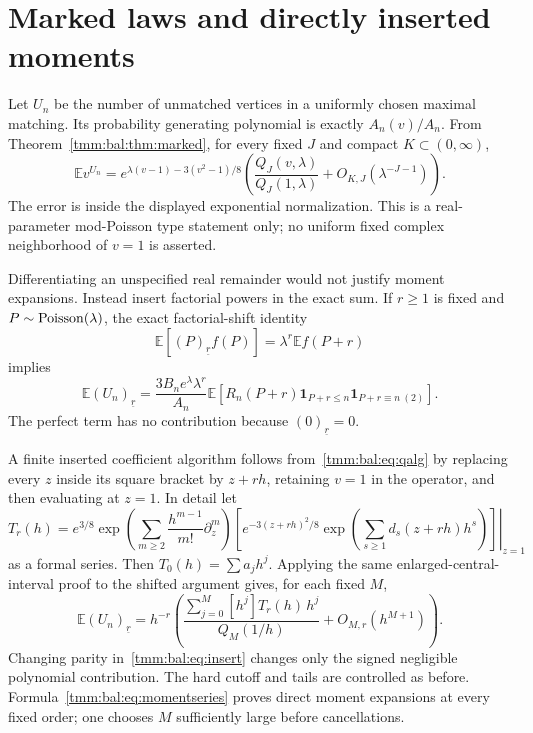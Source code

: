 \documentclass[11pt,letterpaper]{article}
\theoremstyle{remark}\newtheorem{remark}[theorem]{Remark}
\newcommand{\E}{\mathbb E}\newcommand{\Pp}{\mathbb P}
\newcommand{\one}{\mathbf 1}\newcommand{\TV}{d_{\mathrm{TV}}}
\newcommand{\fall}[2]{(#1)_{\underline{#2}}}
\begin{document}
\section{Marked laws and directly inserted moments}\label{tmm:bal:sec:moments}
Let $U_n$ be the number of unmatched vertices in a uniformly chosen maximal matching. Its probability generating polynomial is exactly $A_n(v)/A_n$. From Theorem~\ref{tmm:bal:thm:marked}, for every fixed $J$ and compact $K\subset(0,\infty)$,
\begin{equation}\label{tmm:bal:eq:mgf}
 \E v^{U_n}=e^{\lambda(v-1)-3(v^2-1)/8}
 \left(\frac{Q_J(v,\lambda)}{Q_J(1,\lambda)}
                 +O_{K,J}(\lambda^{-J-1})\right).
\end{equation}
The error is inside the displayed exponential normalization. This is a real-parameter mod-Poisson type statement only; no uniform fixed complex neighborhood of $v=1$ is asserted.

Differentiating an unspecified real remainder would not justify moment expansions. Instead insert factorial powers in the exact sum. If $r\ge1$ is fixed and $P\sim\operatorname{Poisson}(\lambda)$, the exact factorial-shift identity
\begin{equation}\label{tmm:bal:eq:shift}
 \E[\fall P r f(P)]=\lambda^r\E f(P+r)
\end{equation}
implies
\begin{equation}\label{tmm:bal:eq:insert}
 \E\fall{U_n}r=
 \frac{3B_ne^\lambda\lambda^r}{A_n}
 \E\left[R_n(P+r)\one_{P+r\le n}\one_{P+r\equiv n\ (2)}\right].
\end{equation}
The perfect term has no contribution because $\fall0r=0$.

A finite inserted coefficient algorithm follows from~\eqref{tmm:bal:eq:qalg} by replacing every $z$ inside its square bracket by $z+rh$, retaining $v=1$ in the operator, and then evaluating at $z=1$. In detail let
\begin{equation}\label{tmm:bal:eq:Tr}
 T_r(h)=e^{3/8}\left.
 \exp\left(\sum_{m\ge2}\frac{h^{m-1}}{m!}\partial_z^m\right)
 \left[e^{-3(z+rh)^2/8}
       \exp\left(\sum_{s\ge1}d_s(z+rh)h^s\right)\right]
 \right|_{z=1}
\end{equation}
as a formal series. Then $T_0(h)=\sum a_jh^j$. Applying the same enlarged-central-interval proof to the shifted argument gives, for each fixed $M$,
\begin{equation}\label{tmm:bal:eq:momentseries}
 \E\fall{U_n}r
   =h^{-r}\left(\frac{\sum_{j=0}^M[h^j]T_r(h)\,h^j}
                         {Q_M(1/h)}+O_{M,r}(h^{M+1})\right).
\end{equation}
Changing parity in~\eqref{tmm:bal:eq:insert} changes only the signed negligible polynomial contribution. The hard cutoff and tails are controlled as before. Formula~\eqref{tmm:bal:eq:momentseries} proves direct moment expansions at every fixed order; one chooses $M$ sufficiently large before cancellations.
\end{document}
